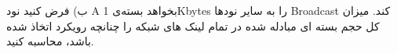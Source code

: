 \documentclass[10pt,letterpaper]{article}
\begin{document}
ب) فرض کنید نود A بخواهد بسته‌ی 1Kbytes را به سایر نودها Broadcast کند. میزان کل حجم بسته ای مبادله شده در تمام لینک های شبکه را چنانچه رویکرد 
اتخاذ شده باشد، محاسبه کنید.
%
%
%
%
%
%
%
\end{document}
